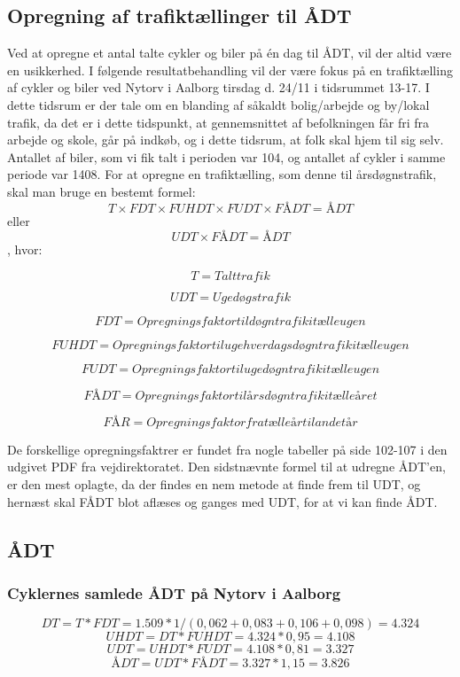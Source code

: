 \subsection{Opregning af trafiktællinger til ÅDT}
\label{sub:opregning}
Ved at opregne et antal talte cykler og biler på én dag til ÅDT, vil der altid være en usikkerhed. 
I følgende resultatbehandling vil der være fokus på en trafiktælling af cykler og biler ved Nytorv i Aalborg tirsdag d. 24/11 i tidsrummet 13-17. I dette tidsrum er der tale om en blanding af såkaldt bolig/arbejde og by/lokal trafik, da det er i dette tidspunkt, at gennemsnittet af befolkningen får fri fra arbejde og skole, går på indkøb, og i dette tidsrum, at folk skal hjem til sig selv.
Antallet af biler, som vi fik talt i perioden var 104, og antallet af cykler i samme periode var 1408.
For at opregne en trafiktælling, som denne til årsdøgnstrafik, skal man bruge en bestemt formel:
$$ T \times FDT \times FUHDT \times FUDT \times FÅDT = ÅDT $$ eller $$ UDT \times FÅDT = ÅDT$$ , hvor:

$$T = Talt trafik$$

$$UDT = Ugedøgstrafik$$

$$FDT = Opregningsfaktor til døgntrafik i tælleugen$$

$$FUHDT = Opregningsfaktor til ugehverdagsdøgntrafik i tælleugen$$

$$FUDT = Opregningsfaktor til ugedøgntrafik i tælleugen$$

$$FÅDT = Opregningsfaktor til årsdøgntrafik i tælleåret$$ 

$$FÅR = Opregningsfaktor fra tælleår til andet år$$

De forskellige opregningsfaktrer er fundet fra nogle tabeller på side 102-107 i den udgivet PDF fra vejdirektoratet. Den sidstnævnte formel til at udregne ÅDT’en, er den mest oplagte, da der findes en nem metode at finde frem til UDT, og hernæst skal FÅDT blot aflæses og ganges med UDT, for at vi kan finde ÅDT.

\subsection{ÅDT}
\label{AEDT}
\subsubsection{Cyklernes samlede ÅDT på Nytorv i Aalborg}
$$DT = T * FDT = 1.509 * 1/(0,062 +0,083+0,106+0,098) = 4.324$$
$$UHDT = DT * FUHDT = 4.324* 0,95 = 4.108$$
$$UDT = UHDT * FUDT = 4.108* 0,81 = 3.327$$
$$ÅDT = UDT * FÅDT = 3.327 * 1,15 = 3.826$$
